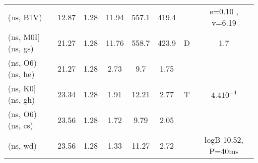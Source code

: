 \documentclass{article}
\begin{document}
\begin{table}
\begin{tabular}{p{4cm}ccccccc}
(ns, B1V)         	& 12.87	& 1.28	& 11.94	& 557.1	& 419.4	&  	&  e=0.10 , v=6.19	\\
(ns, M0I$]$ (ns, gs)	& 21.27	& 1.28	& 11.76	& 558.7 & 423.9	& D	& 1.7         		\\
(ns, O6) (ns, he)	& 21.27	& 1.28	& 2.73 	& 9.7   & 1.75 	&  	&             		\\
(ns, K0$]$ (ns, gh)	& 23.34	& 1.28	& 1.91 	& 12.21 & 2.77 	& T	& $4.4 10^{-4}$		\\
(ns, O6) (ns, cs)	& 23.56	& 1.28	& 1.72 	& 9.79  & 2.05 	&  	&                	\\
(ns, wd)         	& 23.56	& 1.28	& 1.33 	& 11.27 & 2.72 	&  	& logB 10.52, P=40ms   	\\
\hline
\end{tabular}
\end{table}
\end{document}
